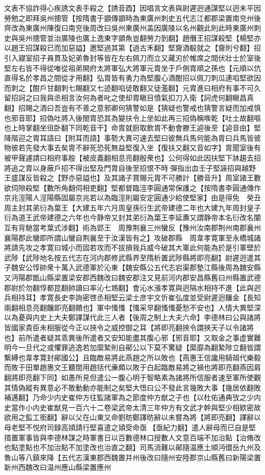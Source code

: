文表不協詐得心疾誘文表手殺之【誘音酉】因唱言文表與尉遲迥通謀堅以迥未平因勞勉之即拜吳州摠管【按隋書于顗傳顗時為東廣州刺史五代志江都郡梁置南兖州後齊改為東廣州陳復曰南兖後周改曰吳州東廣州盖因廣陵以名州觀此則此時東廣州刺史與吳州摠管並治廣陵也廣上逸東字顗魚豈翻勞力到翻】趙僭王招謀殺堅【楊堅亦以趙王招謀殺已而加惡謚】邀堅過其第【過古禾翻】堅齎酒殽就之【齎則兮翻】招引入寢室招子員貫及妃弟魯封等皆在左右佩刀而立又藏刃於帷席之間伏壯士於室後堅左右皆不得從唯從祖弟開府太將軍弘大將軍元胄坐于戶側胄順之孫也【元順以伉直得名於孝昌之間從才用翻】弘胄皆有勇力為堅腹心酒酣招以佩刀刺瓜連啗堅欲因而刺之【酣戶甘翻刺七賜翻又七迹翻啗徒敢翻又徒濫翻】元胄進曰相府有事不可久留招訶之曰我與丞相言汝何為者叱之使却胄瞋目憤氣扣刀入衛【訶虎何翻瞋昌真翻】招賜之酒曰吾豈有不善之意邪卿何猜警如是【猜疑也警戒也猜警言疑而加戒慎也邪音耶】招偽吐將入後閤胄恐其為變扶令上坐如此再三招偽稱㗋乾【吐土故翻嘔也上時掌翻坐徂卧翻下同乾音干】命胄就厨取飲胄不動會滕王逌後至【逌音由】堅降階迎之胄耳語曰【附耳而語】事勢大異可速去堅曰彼無兵馬何能為胄曰兵馬皆彼物彼若先發大事去矣胄不辭死恐死無益堅復入坐【復扶又翻又音如字】胄聞室後有被甲聲遽請曰相府事殷【被皮義翻相息亮翻殷衆也】公何得如此因扶堅下牀趨去招將追之胄以身蔽戶招不得出堅及門胄自後至招恨不時彈指出血壬子堅誣招與越野王盛謀反皆殺之【野亦惡謚也】及其諸子賞賜元胄不可勝計【勝音升】周室諸王數欲伺隙殺堅【數所角翻伺相吏翻】堅都督臨涇李圓通常保護之【按隋書李圓通傳作京兆涇陽人涇陽縣固屬京兆若以為臨涇則屬安定圓通少給使堅家】由是得免　癸丑周主封其弟衍為葉王【大建五年六月周皇孫衍生武帝建德二年也大建九年周封皇子衍為道王武帝建德之六年也今静帝又封其弟衍為葉王李延夀又謂静帝本名衍改名闡互有背馳當考葉式涉翻】術為郢王　周豫荆襄三州蠻反【豫州汝南郡荆州南郡襄州襄陽郡此蠻即所謂山蠻自荆襄至于汝漢皆有之】攻破郡縣　周韋孝寛軍至永橋城諸將請先攻之孝寛曰城小而固若攻而不拔損我兵威今破其大軍此何能為於是引軍壁於武陟【武陟地名按五代志在河内郡修武縣界至隋析置武陟縣將即亮翻】尉遲迥遣其子魏安公惇帥衆十萬入武德軍於沁東【魏安縣公五代志宕渠郡墊江縣後周為魏安縣又沔陽郡甑山縣梁置梁安郡西魏改曰魏安郡注又見前河内郡安昌縣舊曰州縣置武德郡尉於勿翻惇都昆翻帥讀曰率沁七鴆翻】會沁水漲孝寛與迥隔水相持不進【此與迥兵相持耳】孝寛長史李詢密啓丞相堅云梁士彦宇文忻崔弘度並受尉遲迥饟金【長知兩翻相息亮翻饟即亮翻饋也】軍中慅慅【慅采早翻慅慅憂愁不安也】人情大異堅深以為憂與内史上大夫鄭譯謀代此三人者【後周之制上大夫六命】李德林曰公與諸將皆國家貴臣未相服從今正以挾令之威控御之耳【將即亮翻挾令謂挾天子以令諸將也】前所遣者疑其乖異後所遣者又安知能盡其腹心邪【邪音耶】又取金之事虚實難明今一旦代之或懼罪逃逸若加縻縶則自鄖公以下莫不驚疑【縻靡為翻縶陟立翻皆謂繫縛也韋孝寛封鄖國公】且臨敵易將此燕趙之所以敗也【燕惠王信讒用騎刼代樂毅而敗于田單趙惠文王聽間用趙括代亷頗以敗于白起臨敵易將之禍也將即亮翻燕因肩翻將即亮翻下同】如愚所見但遣公一腹心明于智略素為諸將所信服者速至軍所使觀其情偽縱有異意必不敢動動亦能制之矣堅大悟曰公不發此言幾敗大事【幾居依翻敗補邁翻】乃命少内史崔仲方往監諸軍為之節度仲方猷之子也【以杜佑通典攷之少内史當作小内史崔猷見一百六十二卷梁武帝太清三年仲方有文武才幹與堅少相欵密故欲用之監工銜翻】辭以父在山東又命劉昉鄭譯昉辭以未嘗為將【將即亮翻】譯辭以母老堅不悦府司録高熲請行堅喜遣之熲受命亟【亟紀力翻】遣人辭母而已自是堅措置軍事皆與李德林謀之時軍書日以百數德林口授數人文意百端不加治點【治脩改也點塗點也不加治點不加塗改也治直之翻】司馬消難以鄖隨温應土順沔儇岳九州及魯山等八鎮來降【五代志漢東郡西魏置并州後改曰隨州安陸郡京山縣舊曰新陽梁置新州西魏改曰温州應山縣梁置應州